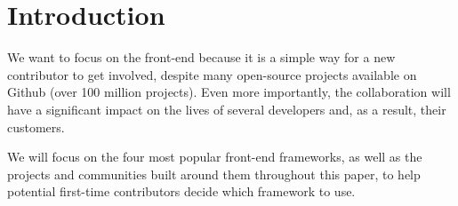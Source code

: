 \section{Introduction}

We want to focus on the front-end because it is a simple way for a new contributor to get involved, despite many open-source projects available on Github (over 100 million projects\cite{intro}). Even more importantly, the collaboration will have a significant impact on the lives of several developers and, as a result, their customers.

We will focus on the four most popular front-end frameworks, as well as the projects and communities built around them throughout this paper, to help potential first-time contributors decide which framework to use.